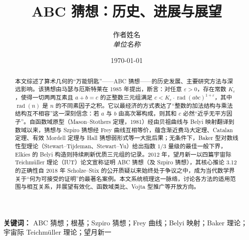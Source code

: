 \documentclass[12pt,a4paper]{article}
\title{ABC 猜想：历史、进展与展望}
\author{
    作者姓名\\
    \textit{单位名称}
}
\date{\today}
\numberwithin{equation}{section}
\begin{document}
\maketitle

\begin{abstract}
    本文综述了算术几何的“万能钥匙”——ABC 猜想——的历史发展、主要研究方法与深远影响。该猜想由马瑟与厄斯特莱在 1985 年提出，断言：对任意 $\varepsilon > 0$，存在常数 $K_\varepsilon$，使得一切两两互素且 $a + b = c$ 的正整数三元组满足 $c < K_\varepsilon \cdot \operatorname{rad}(abc)^{1+\varepsilon}$，其中 $\operatorname{rad}(n)$ 是 $n$ 的不同素因子之积。它以最经济的方式表达了“整数的加法结构与乘法结构互不相容”这一深刻信念：若 $a$ 与 $b$ 由高次幂构成，则其和 $c$ 必然“近乎无平方因子”。自函数域原型（Mason--Stothers 定理，1981）经由贝祖曲线与 Belyi 映射翻译到数域以来，猜想与 Szpiro 猜想经 Frey 曲线互相等价，蕴含渐近费马大定理、Catalan 定理、有效 Mordell 定理与 Hall 猜想弱形式等一大批后果；无条件下，Baker 型对数线性型理论（Stewart--Tijdeman、Stewart--Yu）给出指数 $1/3$ 量级的最佳一般下界，Elkies 的 Belyi 构造则持续刷新优质三元组的记录。2012 年，望月新一以四篇宇宙际 Teichm\"uller 理论（IUT）论文宣称证明 ABC 猜想（及 Szpiro 猜想），其核心推论 3.12 的正确性自 2018 年 Scholze--Stix 的公开质疑以来始终处于争议之中，成为当代数学界关于“何为可接受的证明”的最著名案例。本文系统梳理这一脉络，讨论各方法的适用范围与相互关系，并展望有效化、函数域类比、Vojta 型推广等开放方向。
\end{abstract}

\textbf{关键词：} ABC 猜想；根基；Szpiro 猜想；Frey 曲线；Belyi 映射；Baker 理论；宇宙际 Teichm\"uller 理论；望月新一

\tableofcontents
\newpage












\appendix

\end{document}
